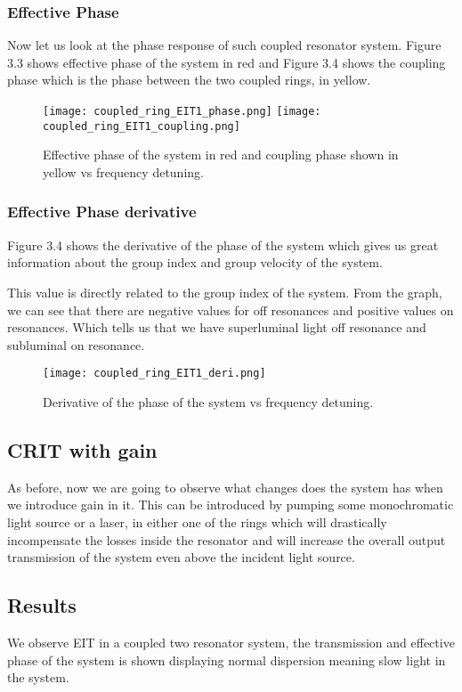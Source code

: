 \subsubsection{Effective Phase}

Now let us look at the phase response of such coupled resonator system. Figure 3.3 shows effective phase of the system in red and Figure 3.4 shows the coupling phase which is the phase between the two coupled rings, in yellow. 

\begin{figure}[h]
\texttt{[image: coupled\_ring\_EIT1\_phase.png]}
\texttt{[image: coupled\_ring\_EIT1\_coupling.png]}
\caption{Effective phase of the system in red and coupling phase shown in yellow vs frequency detuning.}
\end{figure}

\subsubsection{Effective Phase derivative}
Figure 3.4 shows the derivative of the phase of the system which gives us great information about the group index and group velocity of the system. 

This value is directly related to the group index of the system. From the graph, we can see that there are negative values for off resonances and positive values on resonances. Which tells us that we have superluminal light off resonance and subluminal on resonance. 
\begin{figure}[h]
\centering
\texttt{[image: coupled\_ring\_EIT1\_deri.png]}
\caption{Derivative of the phase of the system vs frequency detuning.}
\end{figure}

\newpage
\subsection{CRIT with gain}
As before, now we are going to observe what changes does the system has when we introduce gain in it. This can be introduced by pumping some monochromatic light source or a laser, in either one of the rings which will drastically incompensate the losses inside the resonator and will increase the overall output transmission of the system even above the incident light source. 
\subsection{Results}
We observe EIT in a coupled two resonator system, the transmission and effective phase of the system is shown displaying normal dispersion meaning slow light in the system.

